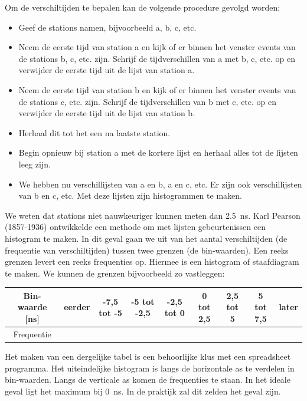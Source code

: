 Om de verschiltijden te bepalen kan de volgende procedure gevolgd
worden:
\begin{itemize}
    \item Geef de stations namen, bijvoorbeeld a, b, c, etc.
    \item Neem de eerste tijd van station a en kijk of er binnen het
    venster events van de stations b, c, etc. zijn. Schrijf de
    tijdverschillen van a met b, c, etc. op en verwijder de eerste tijd
    uit de lijst van station a.
    \item Neem de eerste tijd van station b en kijk of er binnen het
    venster events van de stations c, etc. zijn. Schrijf de
    tijdverschillen van b met c, etc. op en verwijder de eerste tijd uit
    de lijst van station b.
    \item Herhaal dit tot het een na laatste station.
    \item Begin opnieuw bij station a met de kortere lijst en herhaal
    alles tot de lijsten leeg zijn.
    \item We hebben nu verschillijsten van a en b, a en c, etc. Er zijn
    ook verschillijsten van b en c, etc. Met deze lijsten zijn
    histogrammen te maken.
\end{itemize}
We weten dat stations niet nauwkeuriger kunnen meten dan
\SI{2,5}{\nano\second}. Karl Pearson (1857-1936) \cite{wiki} ontwikkelde
een methode om met lijsten gebeurtenissen een histogram te maken. In dit
geval gaan we uit van het aantal verschiltijden (de frequentie van
verschiltijden) tussen twee grenzen (de bin-waarden). Een reeks grenzen
levert een reeks frequenties op. Hiermee is een histogram of
staafdiagram te maken. We kunnen de grenzen bijvoorbeeld zo vastleggen:

\bigskip{}
\begin{tabular}{|c|c|c|c|c|c|c|c|c|}
    \hline
    Bin-waarde {[}ns{]} & eerder & -7,5 tot -5 & -5 tot -2,5 & -2,5 tot 0 & 0 tot 2,5 & 2,5 tot 5 & 5 tot 7,5 & later\tabularnewline
    \hline
    Frequentie &  &  &  &  &  &  &  & \tabularnewline
    \hline
\end{tabular}

\bigskip{}

Het maken van een dergelijke tabel is een behoorlijke klus met een
spreadsheet programma. Het uiteindelijke histogram is langs de horizontale
as te verdelen in bin-waarden. Langs de verticale as komen de frequenties
te staan. In het ideale geval ligt het maximum bij \SI{0}{\nano\second}.
In de praktijk zal dit zelden het geval zijn.

